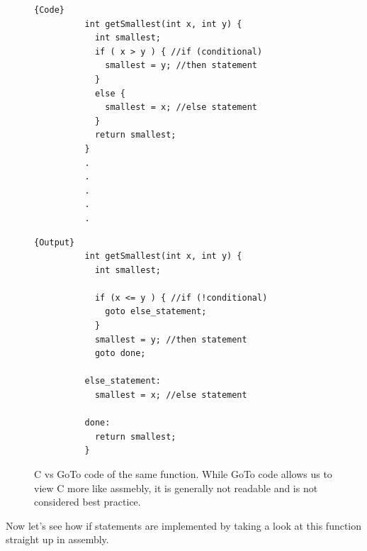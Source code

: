 \documentclass{article}
\begin{document}
      \begin{figure}[H]
        \centering 
        \noindent\begin{minipage}{.5\textwidth}
        \begin{lstlisting}[]{Code}
          int getSmallest(int x, int y) {
            int smallest;
            if ( x > y ) { //if (conditional)
              smallest = y; //then statement
            }
            else {
              smallest = x; //else statement
            }
            return smallest;
          }
          .
          .
          .
          .
          .
        \end{lstlisting}
        \end{minipage}
        \hfill
        \begin{minipage}{.49\textwidth}
        \begin{lstlisting}[]{Output}
          int getSmallest(int x, int y) {
            int smallest;

            if (x <= y ) { //if (!conditional)
              goto else_statement;
            }
            smallest = y; //then statement
            goto done;

          else_statement:
            smallest = x; //else statement

          done:
            return smallest;
          }      
        \end{lstlisting}
        \end{minipage}
        \caption{C vs GoTo code of the same function. While GoTo code allows us to view C more like assmebly, it is generally not readable and is not considered best practice. } 
        \label{fig:c_vs_goto}
      \end{figure}

      Now let's see how if statements are implemented by taking a look at this function straight up in assembly. 
\end{document}
